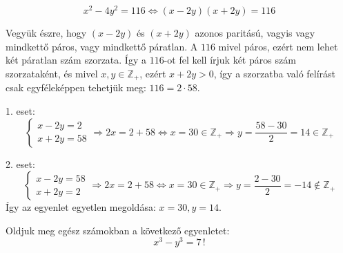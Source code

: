 \begin{solution}
	\[
	x^{2}-4y^{2}=116\Leftrightarrow(x-2y)(x+2y)=116
	\]
	
	Vegyük észre, hogy $(x-2y)$ és $(x+2y)$ azonos paritású, vagyis
	vagy mindkettő páros, vagy mindkettő páratlan. A $116$ mivel páros,
	ezért nem lehet két páratlan szám szorzata. Így a $116$-ot fel kell
	írjuk két páros szám szorzataként, és mivel $x,y\in\mathbb{Z}_{+}$,
	ezért $x+2y>0$, így a szorzatba való felírást csak egyféleképpen
	tehetjük meg: $116=2\cdot58$.
	
	1. eset: 
	\[
	\left\{ \begin{array}{l}
		x-2y=2\\
		x+2y=58
	\end{array}\right.\Rightarrow2x=2+58\Leftrightarrow x=30\in\mathbb{Z}_{+}\Rightarrow y=\dfrac{58-30}{2}=14\in\mathbb{Z}_{+}
	\]
	
	2. eset: 
	\[
	\left\{ \begin{array}{l}
		x-2y=58\\
		x+2y=2
	\end{array}\right.\Rightarrow2x=2+58\Leftrightarrow x=30\in\mathbb{Z}_{+}\Rightarrow y=\dfrac{2-30}{2}=-14\notin\mathbb{Z}_{+}
	\]
	Így az egyenlet egyetlen megoldása: $x=30,y=14$. 
\end{solution}
\begin{extraproblem}
	Oldjuk meg egész számokban a következő egyenletet: 
	\[
	x^{3}-y^{3}=7\,!
	\]
\end{extraproblem}

\vspace{1em}

